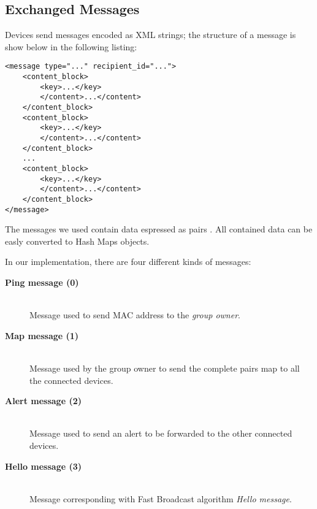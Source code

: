 \subsection{Exchanged Messages}

Devices send messages encoded as XML strings; the structure of a message is show below in the following listing:
\begin{verbatim}
<message type="..." recipient_id="...">
    <content_block>
        <key>...</key>
        </content>...</content>
    </content_block>
    <content_block>
        <key>...</key>
        </content>...</content>
    </content_block>
    ...
    <content_block>
        <key>...</key>
        </content>...</content>
    </content_block>
</message>
\end{verbatim}
The messages we used contain data espressed as pairs . All contained data can be easly converted to Hash Maps objects.

In our implementation, there are four different kinds of messages:
	\begin{description}
		\item[\textbf{Ping message (0)}] \hfill \\
		Message used to send MAC address to the \textit{group owner}.
		\item[\textbf{Map message (1)}] \hfill \\
		Message used by the group owner to send the complete  pairs map to all the connected devices.
		\item[\textbf{Alert message (2)}] \hfill \\
		Message used to send an alert to be forwarded to the other connected devices.
		\item[\textbf{Hello message (3)}] \hfill \\
		Message corresponding with Fast Broadcast algorithm \textit{Hello message}.
	\end{description}
